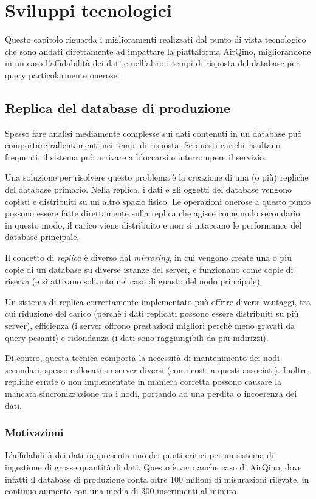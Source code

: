 \chapter{Sviluppi tecnologici}\label{ch:sviluppi}
Questo capitolo riguarda i miglioramenti realizzati dal punto di vista tecnologico che sono andati direttamente ad impattare la piattaforma AirQino, migliorandone in un caso l'affidabilità dei dati e nell'altro i tempi di risposta del database per query particolarmente onerose.

\section{Replica del database di produzione}\label{sec:replica}

Spesso fare analisi mediamente complesse sui dati contenuti in un database può comportare rallentamenti nei tempi di risposta. Se questi carichi risultano frequenti, il sistema può arrivare a bloccarsi e interrompere il servizio.

Una soluzione per risolvere questo problema è la creazione di una (o più) repliche del database primario. Nella replica, i dati e gli oggetti del database vengono copiati e distribuiti su un altro spazio fisico. Le operazioni onerose a questo punto possono essere fatte direttamente sulla replica che agisce come nodo secondario: in questo modo, il carico viene distribuito e non si intaccano le performance del database principale.

Il concetto di \textit{replica} è diverso dal \textit{mirroring}, in cui vengono create una o più copie di un database su diverse istanze del server, e funzionano come copie di riserva (e si attivano soltanto nel caso di guasto del nodo principale).

Un sistema di replica correttamente implementato può offrire diversi vantaggi, tra cui riduzione del carico (perchè i dati replicati possono essere distribuiti su più server), efficienza (i server offrono prestazioni migliori perchè meno gravati da query pesanti) e ridondanza (i dati sono raggiungibili da più indirizzi).

Di contro, questa tecnica comporta la necessità di mantenimento dei nodi secondari, spesso collocati su server diversi (con i costi a questi associati). Inoltre, repliche errate o non implementate in maniera corretta possono causare la mancata sincronizzazione tra i nodi, portando ad una perdita o incoerenza dei dati.

\subsection{Motivazioni}\label{ssec:replica-motivazioni}
L'affidabilità dei dati rappresenta uno dei punti critici per un sistema di ingestione di grosse quantità di dati. Questo è vero anche caso di AirQino, dove infatti il database di produzione conta oltre 100 milioni di misurazioni rilevate, in continuo aumento con una media di 300 inserimenti al minuto.

